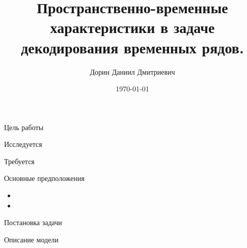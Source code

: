 \documentclass[9pt,pdf]{beamer} %
\title{Пространственно-временные характеристики в задаче декодирования временных рядов.}
\author{Дорин Даниил Дмитриевич}
\date{\today}
\institute[Московский физико-технический институт]{Московский физико-технический институт }
\begin{document}
	\begin{frame}{}
		\maketitle
	\end{frame}

\begin{frame}{Цель работы}
    \begin{block}{Исследуется}
    
    \end{block}
    
    \begin{block}{Требуется}
    
    \end{block}
    \begin{block}{Основные предположения}
    \begin{itemize}
        \item 
        \item 
    \end{itemize}
    \end{block}
\end{frame}

\begin{frame}{Постановка задачи}

\end{frame}


\begin{frame}{Описание модели}

\end{frame}
\end{document}

